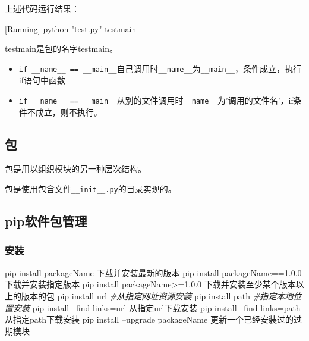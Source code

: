 \documentclass[12pt]{ctexart}
\newenvironment{Shaded}{}{}
\newcommand{\DecValTok}[1]{\textcolor[rgb]{0.25,0.63,0.44}{{#1}}}
\newcommand{\FloatTok}[1]{\textcolor[rgb]{0.25,0.63,0.44}{{#1}}}
\newcommand{\StringTok}[1]{\textcolor[rgb]{0.25,0.44,0.63}{{#1}}}
\newcommand{\CommentTok}[1]{\textcolor[rgb]{0.38,0.63,0.69}{\textit{{#1}}}}
\newcommand{\NormalTok}[1]{{#1}}
\newcommand{\OperatorTok}[1]{\textcolor[rgb]{0.40,0.40,0.40}{{#1}}}
\begin{document}
上述代码运行结果：

\begin{Shaded}
\begin{Highlighting}[]
\NormalTok{[Running] python }\StringTok{"test.py"}
\NormalTok{testmain}
\end{Highlighting}
\end{Shaded}

testmain是包的名字testmain。

\begin{itemize}
\item
  \texttt{if\ \_\_name\_\_\ ==\ \textquotesingle{}\_\_main\_\_\textquotesingle{}}自己调用时\texttt{\_\_name\_\_}为\texttt{\textquotesingle{}\_\_main\_\_\textquotesingle{}}，条件成立，执行if语句中函数
\item
  \texttt{if\ \_\_name\_\_\ ==\ \textquotesingle{}\_\_main\_\_\textquotesingle{}}从别的文件调用时\texttt{\_\_name\_\_}为'调用的文件名'，if条件不成立，则不执行。
\end{itemize}

    \hypertarget{ux5305}{%
\subsection{包}\label{ux5305}}

包是用以组织模块的另一种层次结构。

包是使用包含文件\texttt{\_\_init\_\_.py}的目录实现的。

    \hypertarget{pipux8f6fux4ef6ux5305ux7ba1ux7406}{%
\subsection{pip软件包管理}\label{pipux8f6fux4ef6ux5305ux7ba1ux7406}}

\hypertarget{ux5b89ux88c5}{%
\subsubsection{安装}\label{ux5b89ux88c5}}

\begin{Shaded}
\begin{Highlighting}[]
\NormalTok{pip install packageName 下载并安装最新的版本}
\NormalTok{pip install packageName}\OperatorTok{==}\DecValTok{1}\NormalTok{.}\FloatTok{0.0}\NormalTok{下载并安装指定版本}
\NormalTok{pip install packageName}\OperatorTok{>=}\DecValTok{1}\NormalTok{.}\FloatTok{0.0}\NormalTok{ 下载并安装至少某个版本以上的版本的包}
\NormalTok{pip install url }\CommentTok{#从指定网址资源安装}
\NormalTok{pip install path }\CommentTok{#指定本地位置安装}
\NormalTok{pip install }\OperatorTok{--}\NormalTok{find}\OperatorTok{-}\NormalTok{links}\OperatorTok{=}\NormalTok{url 从指定url下载安装}
\NormalTok{pip install }\OperatorTok{--}\NormalTok{find}\OperatorTok{-}\NormalTok{links}\OperatorTok{=}\NormalTok{path 从指定path下载安装}
\NormalTok{pip install }\OperatorTok{--}\NormalTok{upgrade packageName 更新一个已经安装过的过期模块}
\end{Highlighting}
\end{Shaded}
\end{document}
